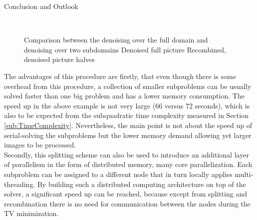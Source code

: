 \begin{chapter}{Conclusion and Outlook}
\begin{figure}[h!]
    \centering
    \\
    \caption[Comparison full domain versus splitted domain denoising]{Comparison between the denoising
    over the full domain and denoising over two subdomains
	 Denoised full picture
	 Recombined, denoised picture halves
	\label{fig:splitting2}
    }
\end{figure}

The advantages of this procedure are firstly, that even though there is some overhead from this procedure, a collection of smaller subproblems can be usually solved faster than one big problem and has a lower memory consumption. The speed up in the above example
is not very large (66 versus 72 seconds), which is also to be expected from the subquadratic time complexity measured in 
Section \ref{sub:TimeComplexity}. Nevertheless, the main point is not about the speed up of serial-solving the subproblems but
the lower memory demand allowing yet larger images to be processed.\\

Secondly, this splitting scheme can also be used to introduce an additional layer of parallelism in the form of distributed memory, 
many core parallelization. Each subproblem can be assigned to a different node that in turn locally applies multi-threading.
By building such a distributed computing architecture on top of the solver, a significant speed up can be reached, because except
from splitting and recombination there is no need for communication between the nodes during the TV minimization.

\end{chapter}
